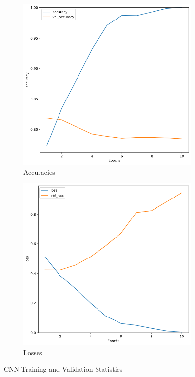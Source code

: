 \documentclass[twocolumn, 11pt]{article}
\begin{document}
\begin{figure}[hb]
    \centering
    \begin{subfigure}[b]{0.45\linewidth}
        \includegraphics[width=\linewidth]{NN-acc.png}
        \caption{Accuracies}
        \label{fig: NN acc}
    \end{subfigure}
    \begin{subfigure}[b]{0.45\linewidth}
        \includegraphics[width=\linewidth]{NN-loss.png}
        \caption{Losses}
        \label{fig: NN loss}
    \end{subfigure}
    \caption{CNN Training and Validation Statistics}
    \label{fig: NN stats}
\end{figure}
\vfill
\end{document}
